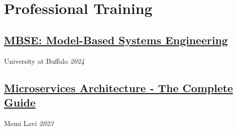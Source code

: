 %
%
%
\section{Professional Training}
%
%
\subsection{\href{https://www.coursera.org/account/accomplishments/verify/KQKRA2UXQ87B}{MBSE: Model-Based Systems Engineering}}
University at Buffalo \textit{2024}
\subsection{\href{https://www.udemy.com/certificate/UC-a8db49e4-26b6-4fa6-b156-d1cc5423de7f/}{Microservices Architecture - The Complete Guide}}
Memi Lavi \textit{2023}
